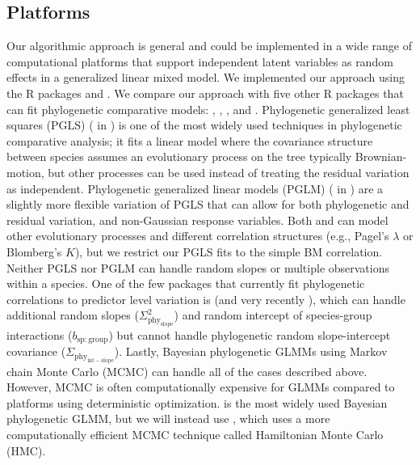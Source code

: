\documentclass[12pt]{article}
\begin{document}
\subsection*{Platforms}

Our algorithmic approach is general and could be implemented in a wide range of computational platforms that support independent latent variables as random effects in a generalized linear mixed model. 
We implemented our approach using the R packages  \citep{bates2015fitting} and  \citep{brooks2017glmmTMB}.
We compare our approach with five other R packages that can fit phylogenetic comparative models:  \citep{pinheiro2014r},  \citep{ho2014phylolm},  \citep{pearse2015pez}, and  \citep{burkner2018brms}.
Phylogenetic generalized least squares (PGLS) ( in ) is one of the most widely used techniques in phylogenetic comparative analysis; it fits a linear model where the covariance structure between species assumes an evolutionary process on the tree typically Brownian-motion, but other processes can be used instead of treating the residual variation as independent.
Phylogenetic generalized linear models (PGLM) ( in ) are a slightly more flexible variation of PGLS that can allow for both phylogenetic and residual variation, and non-Gaussian response variables.
Both  and  can model other evolutionary processes and different correlation structures (e.g., Pagel's $\lambda$ or Blomberg's $K$), but we restrict our PGLS fits to the simple BM correlation. 
Neither PGLS nor PGLM can handle random slopes or multiple observations within a species.
One of the few packages that currently fit phylogenetic correlations to predictor level variation is  (and very recently ), which can handle additional random slopes ($\Sigma^2_{\mathrm{phy_{slope}}}$) and random intercept of species-group interactions ($b_{\mathrm{sp:group}}$) but cannot handle phylogenetic random slope-intercept covariance ($\Sigma_{\mathrm{phy_{int-slope}}}$).
Lastly, Bayesian phylogenetic GLMMs using Markov chain Monte Carlo (MCMC) can handle all of the cases described above. 
However, MCMC is often computationally expensive for GLMMs compared to platforms using deterministic optimization.
 \citep{hadfield2010general} is the most widely used Bayesian phylogenetic GLMM, but we will instead use , which uses a more computationally efficient MCMC technique called Hamiltonian Monte Carlo (HMC)\citep{duane1987hybrid}.
 
\end{document}
